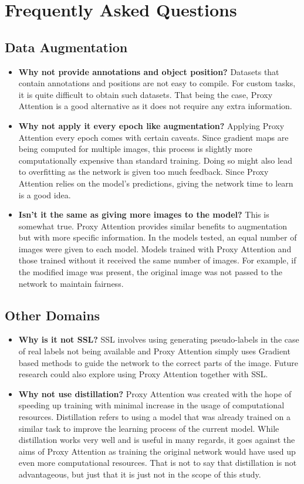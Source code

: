 \chapter{Frequently Asked Questions} \label{ch:faq}

\section{Data Augmentation}
\begin{itemize}
    \item \textbf{Why not provide annotations and object position? }Datasets that contain annotations and positions are not easy to compile. For custom tasks, it is quite difficult to obtain such datasets. That being the case, Proxy Attention is a good alternative as it does not require any extra information.

    \item \textbf{Why not apply it every epoch like augmentation? } Applying Proxy Attention every epoch comes with certain caveats. Since gradient maps are being computed for multiple images, this process is slightly more computationally expensive than standard training. Doing so might also lead to overfitting as the network is given too much feedback. Since Proxy Attention relies on the model's predictions, giving the network time to learn is a good idea.

    \item \textbf{Isn't it the same as giving more images to the model? } This is somewhat true. Proxy Attention provides similar benefits to augmentation but with more specific information. In the models tested, an equal number of images were given to each model. Models trained with Proxy Attention and those trained without it received the same number of images. For example, if the modified image was present, the original image was not passed to the network to maintain fairness.
\end{itemize}

\section{Other Domains}
\begin{itemize}
\item \textbf{Why is it not SSL?} SSL involves using generating pseudo-labels in the case of real labels not being available and Proxy Attention simply uses Gradient based methods to guide the network to the correct parts of the image. Future research could also explore using Proxy Attention together with SSL.
\item \textbf{Why not use distillation?} Proxy Attention was created with the hope of speeding up training with minimal increase in the usage of computational resources. Distillation refers to using a model that was already trained on a similar task to improve the learning process of the current model. While distillation works very well and is useful in many regards, it goes against the aims of Proxy Attention as training the original network would have used up even more computational resources. That is not to say that distillation is not advantageous, but just that it is just not in the scope of this study.
\end{itemize}

